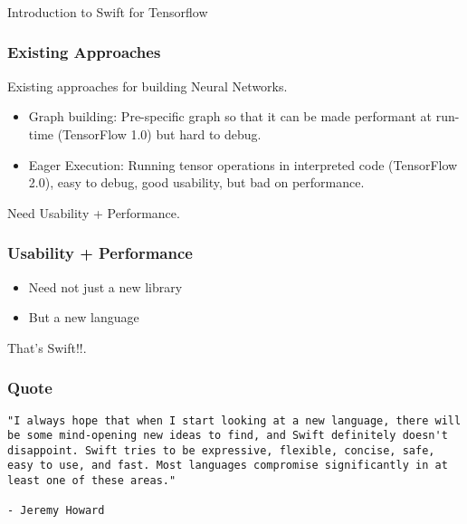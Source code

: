 \begin{frame}[fragile]\frametitle{}
\begin{center}
{\Large Introduction to Swift for Tensorflow}
\end{center}
\end{frame}

\begin{frame}[fragile] \frametitle{Existing Approaches}

Existing approaches for building Neural Networks.

\begin{itemize}
\item Graph building: Pre-specific graph so that it can be made performant at run-time (TensorFlow 1.0) but hard to debug.
\item Eager Execution: Running tensor operations in interpreted code (TensorFlow 2.0), easy to debug, good usability, but bad on performance.
\end{itemize}

Need Usability + Performance.

\end{frame}

\begin{frame}[fragile] \frametitle{Usability + Performance}

\begin{itemize}
\item Need not just a new library
\item But a new language
\end{itemize}

That's Swift!!.

\end{frame}


\begin{frame}[fragile]\frametitle{Quote}
\begin{lstlisting}
"I always hope that when I start looking at a new language, there will be some mind-opening new ideas to find, and Swift definitely doesn't disappoint. Swift tries to be expressive, flexible, concise, safe, easy to use, and fast. Most languages compromise significantly in at least one of these areas."

- Jeremy Howard
\end{lstlisting}
\end{frame}

